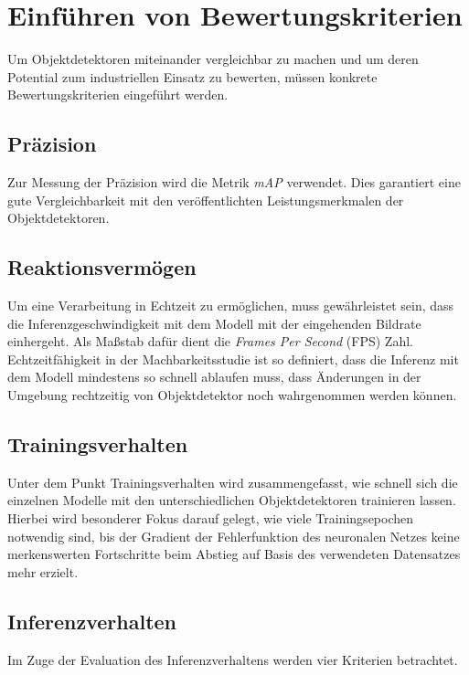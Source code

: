 \section{Einführen von Bewertungskriterien} \label{eval}

Um Objektdetektoren miteinander vergleichbar zu machen und um deren Potential zum industriellen Einsatz zu bewerten, müssen konkrete Bewertungskriterien eingeführt werden.

\subsection*{Präzision}

Zur Messung der Präzision wird die Metrik \textit{mAP} verwendet. Dies garantiert eine gute Vergleichbarkeit mit den veröffentlichten Leistungsmerkmalen der Objektdetektoren.

\subsection*{Reaktionsvermögen}

Um eine Verarbeitung in Echtzeit zu ermöglichen, muss gewährleistet sein, dass die Inferenzgeschwindigkeit mit dem Modell mit der eingehenden Bildrate einhergeht. Als Maßstab dafür dient die \textit{Frames Per Second} (FPS) Zahl. Echtzeitfähigkeit in der Machbarkeitsstudie ist so definiert, dass die Inferenz mit dem Modell mindestens so schnell ablaufen muss, dass Änderungen in der Umgebung rechtzeitig von Objektdetektor noch wahrgenommen werden können. 

\subsection*{Trainingsverhalten}

Unter dem Punkt Trainingsverhalten wird zusammengefasst, wie schnell sich die einzelnen Modelle mit den unterschiedlichen Objektdetektoren trainieren lassen. Hierbei wird besonderer Fokus darauf gelegt, wie viele Trainingsepochen notwendig sind, bis der Gradient der Fehlerfunktion des neuronalen Netzes keine merkenswerten Fortschritte beim Abstieg auf Basis des verwendeten Datensatzes mehr erzielt.

\subsection*{Inferenzverhalten}

Im Zuge der Evaluation des Inferenzverhaltens werden vier Kriterien betrachtet. 

